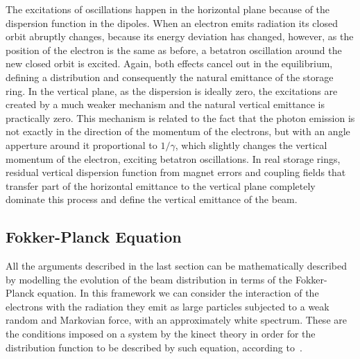    The excitations of oscillations happen in the horizontal plane because of the dispersion function in the dipoles. When an electron emits radiation its closed orbit abruptly changes, because its energy deviation has changed, however, as the position of the electron is the same as before, a betatron oscillation around the new closed orbit is excited. Again, both effects cancel out in the equilibrium, defining a distribution and consequently the natural emittance of the storage ring. In the vertical plane, as the dispersion is ideally zero, the excitations are created by a much weaker mechanism and the natural vertical emittance is practically zero. This mechanism is related to the fact that the photon emission is not exactly in the direction of the momentum of the electrons, but with an angle apperture around it proportional to $1/\gamma$, which slightly changes the vertical momentum of the electron, exciting betatron oscillations. In real storage rings, residual vertical dispersion function from magnet errors and coupling fields that transfer part of the horizontal emittance to the vertical plane completely dominate this process and define the vertical emittance of the beam.

\subsection{Fokker-Planck Equation}\label{ssec:fokker_planck_equation}

	All the arguments described in the last section can be mathematically described by modelling the evolution of the beam distribution in terms of the Fokker-Planck equation. In this framework we can consider the interaction of the electrons with the radiation they emit as large particles subjected to a weak random and Markovian force, with an approximately white spectrum. These are the conditions imposed on a system by the kinect theory in order for the distribution function to be described by such equation, according to~.

